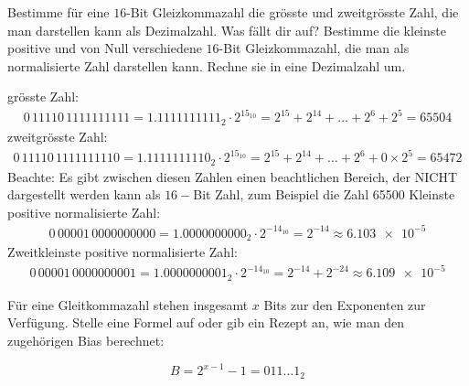 \begin{question}
	\begin{tasks}
		\task Bestimme für eine $16$-Bit Gleizkommazahl die grösste und zweitgrösste Zahl, die man darstellen kann als Dezimalzahl. Was fällt dir auf?
		\task Bestimme die kleinste positive und von Null verschiedene $16$-Bit Gleizkommazahl, die man als normalisierte Zahl darstellen kann. Rechne sie in eine Dezimalzahl um.
	\end{tasks}
\end{question}
\begin{solution}
	\begin{tasks}
		\task grösste Zahl:
			\begin{align*}
				0\,11110\,1111111111
				= 1.1111111111_2 \cdot 2^{15_{10}}
				= 2^{15} + 2^{14} + \ldots + 2^6 + 2^5
				= \num{65504}
			\end{align*}
			zweitgrösste Zahl:
			\begin{align*}
				0\,11110\,1111111110
				= 1.1111111110_2 \cdot 2^{15_{10}}
				= 2^{15} + 2^{14} + \ldots + 2^6 + 0 \times 2^5
				= \num{65472}
			\end{align*}
			Beachte: Es gibt zwischen diesen Zahlen einen beachtlichen Bereich, der NICHT dargestellt werden kann als $16-$Bit Zahl, zum Beispiel die Zahl \num{65500}
		\task Kleinste positive normalisierte Zahl:
		\begin{align*}
			0\,00001\,0000000000
			= 1.0000000000_2 \cdot 2^{-14_{10}}
			= 2^{-14}
			\approx \num{6.103e-5}
		\end{align*}
		Zweitkleinste positive normalisierte Zahl:
		\begin{align*}
			0\,00001\,0000000001
			= 1.0000000001_2 \cdot 2^{-14_{10}}
			= 2^{-14} + 2^{-24}
			\approx \num{6.109e-5}
		\end{align*}

	\end{tasks}
\end{solution}

\begin{question}
	Für eine Gleitkommazahl stehen insgesamt $x$ Bits zur den Exponenten zur Verfügung. Stelle eine Formel auf oder gib ein Rezept an, wie man den zugehörigen Bias berechnet:
\end{question}
\begin{solution}
	$$B = 2^{x-1}-1 = 011\ldots1_2$$
\end{solution}

